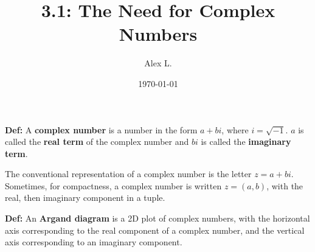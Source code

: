 \documentclass{article}
\title{3.1: The Need for Complex Numbers}
\author{Alex L.}
\date{\today}
\begin{document}
\maketitle

\textbf{Def:} A \textbf{complex number} is a number in the form $a+bi$, where $i = \sqrt{-1}$. $a$ is called the \textbf{real term} of the complex number and $bi$ is called the \textbf{imaginary term}.

The conventional representation of a complex number is the letter $z = a+bi$. Sometimes, for compactness, a complex number is written $z = (a,b)$, with the real, then imaginary component in a tuple.

\textbf{Def:} An \textbf{Argand diagram} is a 2D plot of complex numbers, with the horizontal axis corresponding to the real component of a complex number, and the vertical axis corresponding to an imaginary component. 

\end{document}
